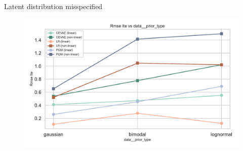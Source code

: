 \documentclass[10pt]{beamer}
\begin{document}
\begin{frame}{Latent distribution misspecified}
    \begin{figure}[H]
      \includegraphics[width=\textwidth]{images/MyRun_data__prior_type--rmse_ite.pdf}
    \end{figure}
\end{frame}



\end{document}

